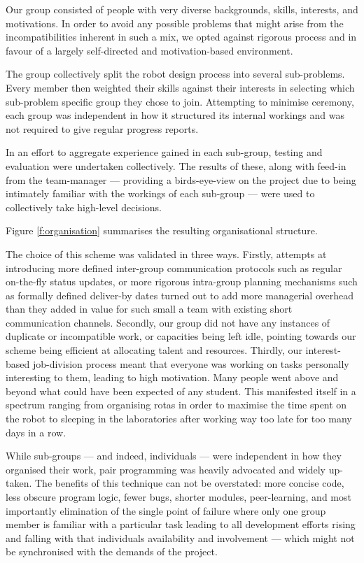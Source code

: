 \documentclass[journal,a4paper,12pt]{IEEEtran}
\begin{document}
Our group consisted of people with very diverse backgrounds, skills, interests, and motivations. In order to avoid any possible problems that might arise from the incompatibilities inherent in such a mix, we opted against rigorous process and in favour of a largely self-directed and motivation-based environment.

The group collectively split the robot design process into several sub-problems. Every member then weighted their skills against their interests in selecting which sub-problem specific group they chose to join. Attempting to minimise ceremony, each group was independent in how it structured its internal workings and was not required to give regular progress reports.

In an effort to aggregate experience gained in each sub-group, testing and evaluation were undertaken collectively. The results of these, along with feed-in from the team-manager --- providing a birds-eye-view on the project due to being intimately familiar with the workings of each sub-group --- were used to  collectively take high-level decisions.

Figure \ref{f:organisation} summarises the resulting organisational structure.

The choice of this scheme was validated in three ways. Firstly, attempts at introducing more defined inter-group communication protocols such as regular on-the-fly status updates, or more rigorous intra-group planning mechanisms such as formally defined deliver-by dates turned out to add more managerial overhead than they added in value for such small a team with existing short communication channels. Secondly, our group did not have any instances of duplicate or incompatible work, or capacities being left idle, pointing towards our scheme being efficient at allocating talent and resources. Thirdly, our interest-based job-division process meant that everyone was working on tasks personally interesting to them, leading to high motivation. Many people went above and beyond what could have been expected of any student. This manifested itself in a spectrum ranging from organising rotas in order to maximise the time spent on the robot to sleeping in the laboratories after working way too late for too many days in a row.

While sub-groups --- and indeed, individuals --- were independent in how they organised their work, pair programming was heavily advocated and widely up-taken. The benefits of this technique can not be overstated: more concise code, less obscure program logic, fewer bugs, shorter modules, peer-learning, and most importantly elimination of the single point of failure where only one group member is familiar with a particular task leading to all development efforts rising and falling with that individuals availability and involvement --- which might not be synchronised with the demands of the project.
\end{document}
